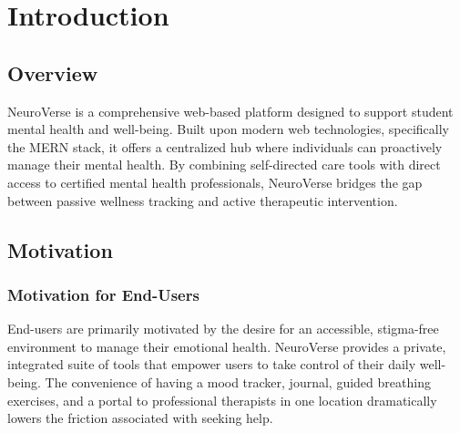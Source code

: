 \documentclass[a4paper,11pt]{report}
\begin{document}
\clearpage
\tableofcontents
{}

\clearpage
\listoffigures
{}

\clearpage
\listoftables
{}

\clearpage
{}
\setcounter{page}{1}

\let\origclearpage\clearpage
\let\origcleardoublepage\cleardoublepage
\let\clearpage\relax
\let\cleardoublepage\relax

\renewcommand\bibname{References}

\chapter{Introduction}

\section{Overview}
NeuroVerse is a comprehensive web-based platform designed to support student mental health and well-being. Built upon modern web technologies, specifically the MERN stack, it offers a centralized hub where individuals can proactively manage their mental health. By combining self-directed care tools with direct access to certified mental health professionals, NeuroVerse bridges the gap between passive wellness tracking and active therapeutic intervention.

\section{Motivation}
\subsection{Motivation for End-Users}
End-users are primarily motivated by the desire for an accessible, stigma-free environment to manage their emotional health. NeuroVerse provides a private, integrated suite of tools that empower users to take control of their daily well-being. The convenience of having a mood tracker, journal, guided breathing exercises, and a portal to professional therapists in one location dramatically lowers the friction associated with seeking help.
\end{document}
